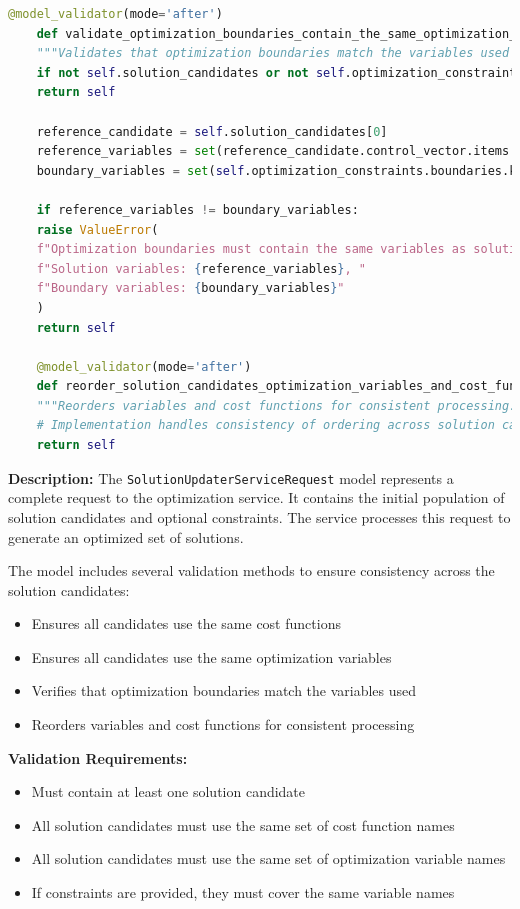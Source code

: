 \begin{lstlisting}[language=Python, caption={SolutionUpdaterServiceRequest model with complex validation logic}]
	@model_validator(mode='after')
	def validate_optimization_boundaries_contain_the_same_optimization_variables(self) -> 'SolutionUpdaterServiceRequest':
	"""Validates that optimization boundaries match the variables used in solutions."""
	if not self.solution_candidates or not self.optimization_constraints:
	return self
	
	reference_candidate = self.solution_candidates[0]
	reference_variables = set(reference_candidate.control_vector.items.keys())
	boundary_variables = set(self.optimization_constraints.boundaries.keys())
	
	if reference_variables != boundary_variables:
	raise ValueError(
	f"Optimization boundaries must contain the same variables as solution candidates. "
	f"Solution variables: {reference_variables}, "
	f"Boundary variables: {boundary_variables}"
	)
	return self
	
	@model_validator(mode='after')
	def reorder_solution_candidates_optimization_variables_and_cost_functions(self) -> 'SolutionUpdaterServiceRequest':
	"""Reorders variables and cost functions for consistent processing."""
	# Implementation handles consistency of ordering across solution candidates
	return self
\end{lstlisting}

\textbf{Description:}
The \texttt{SolutionUpdaterServiceRequest} model represents a complete request to the optimization service. It contains the initial population of solution candidates and optional constraints. The service processes this request to generate an optimized set of solutions.

The model includes several validation methods to ensure consistency across the solution candidates:
\begin{itemize}
	\item Ensures all candidates use the same cost functions
	\item Ensures all candidates use the same optimization variables
	\item Verifies that optimization boundaries match the variables used
	\item Reorders variables and cost functions for consistent processing
\end{itemize}

\textbf{Validation Requirements:}
\begin{itemize}
	\item Must contain at least one solution candidate
	\item All solution candidates must use the same set of cost function names
	\item All solution candidates must use the same set of optimization variable names
	\item If constraints are provided, they must cover the same variable names
\end{itemize}







